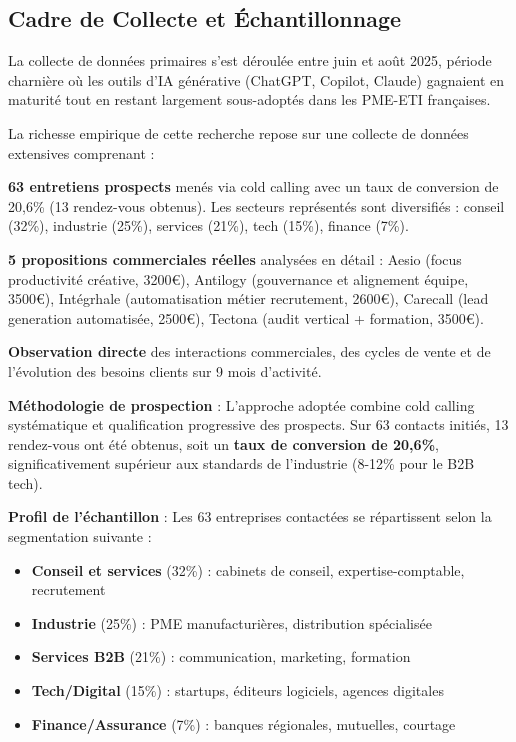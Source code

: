 \documentclass[12pt,a4paper]{report}
\begin{document}
\subsection{Cadre de Collecte et Échantillonnage}

La collecte de données primaires s'est déroulée entre juin et août 2025, période charnière où les outils d'IA générative (ChatGPT, Copilot, Claude) gagnaient en maturité tout en restant largement sous-adoptés dans les PME-ETI françaises.

La richesse empirique de cette recherche repose sur une collecte de données extensives comprenant :

\textbf{63 entretiens prospects} \cite{luwai2025base} menés via cold calling avec un taux de conversion de 20,6\% (13 rendez-vous obtenus). Les secteurs représentés sont diversifiés : conseil (32\%), industrie (25\%), services (21\%), tech (15\%), finance (7\%).

\textbf{5 propositions commerciales réelles} analysées en détail : Aesio \cite{luwai2025aesio} (focus productivité créative, 3200€), Antilogy \cite{luwai2025antilogy} (gouvernance et alignement équipe, 3500€), Intégrhale \cite{luwai2025integrhale} (automatisation métier recrutement, 2600€), Carecall \cite{luwai2025carecall} (lead generation automatisée, 2500€), Tectona \cite{luwai2025tectona} (audit vertical + formation, 3500€).

\textbf{Observation directe} des interactions commerciales, des cycles de vente et de l'évolution des besoins clients sur 9 mois d'activité.

\textbf{Méthodologie de prospection} : L'approche adoptée combine cold calling systématique et qualification progressive des prospects. Sur 63 contacts initiés, 13 rendez-vous ont été obtenus, soit un \textbf{taux de conversion de 20,6\%}, significativement supérieur aux standards de l'industrie (8-12\% pour le B2B tech).

\textbf{Profil de l'échantillon} : Les 63 entreprises contactées se répartissent selon la segmentation suivante :
\begin{itemize}
\item \textbf{Conseil et services} (32\%) : cabinets de conseil, expertise-comptable, recrutement
\item \textbf{Industrie} (25\%) : PME manufacturières, distribution spécialisée
\item \textbf{Services B2B} (21\%) : communication, marketing, formation
\item \textbf{Tech/Digital} (15\%) : startups, éditeurs logiciels, agences digitales
\item \textbf{Finance/Assurance} (7\%) : banques régionales, mutuelles, courtage
\end{itemize}
\end{document}
